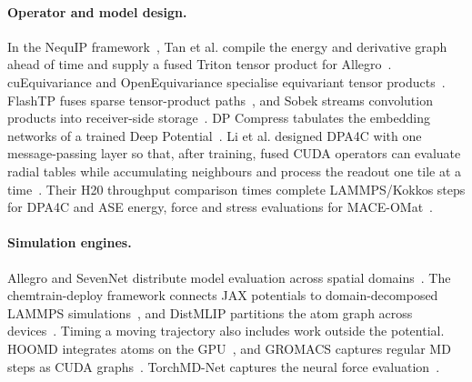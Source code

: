 \paragraph{Operator and model design.}
In the NequIP framework~\cite{batzner2022nequip}, Tan et al. compile the energy and derivative graph ahead of time and supply a fused Triton tensor product for Allegro~\cite{tan2026inference}. cuEquivariance and OpenEquivariance specialise equivariant tensor products~\cite{nvidia2026cueq,bharadwaj2025oeq}. FlashTP fuses sparse tensor-product paths~\cite{lee2025flashtp}, and Sobek streams convolution products into receiver-side storage~\cite{chorosajev2026sobek}. DP Compress tabulates the embedding networks of a trained Deep Potential~\cite{lu2022dpcompress}. Li et al. designed DPA4C with one message-passing layer so that, after training, fused CUDA operators can evaluate radial tables while accumulating neighbours and process the readout one tile at a time~\cite[\S 4.4]{li2026dpa4c}. Their H20 throughput comparison times complete LAMMPS/Kokkos steps for DPA4C and ASE energy, force and stress evaluations for MACE-OMat~\cite[Table~1, note~b]{li2026dpa4c}.

\paragraph{Simulation engines.}
Allegro and SevenNet distribute model evaluation across spatial domains~\cite{musaelian2023scaling,park2024parallel}. The chemtrain-deploy framework connects JAX potentials to domain-decomposed LAMMPS simulations~\cite{fuchs2025chemtrain,thompson2022lammps}, and DistMLIP partitions the atom graph across devices~\cite{han2026distmlip}. Timing a moving trajectory also includes work outside the potential. HOOMD integrates atoms on the GPU~\cite{anderson2008gpumd}, and GROMACS captures regular MD steps as CUDA graphs~\cite{pall2020gromacs,gray2023gromacsgraphs}. TorchMD-Net captures the neural force evaluation~\cite{pelaez2024torchmdnet}.
